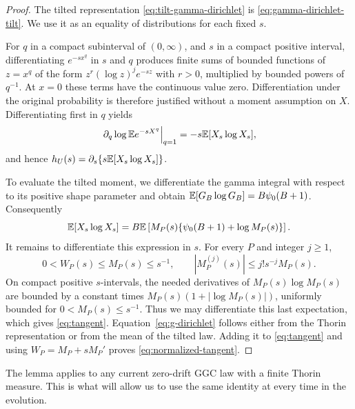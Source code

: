 \begin{proof}
The tilted representation \eqref{eq:tilt-gamma-dirichlet} is \eqref{eq:gamma-dirichlet-tilt}.
We use it as an equality of distributions for each fixed $s$.

For $q$ in a compact subinterval of $(0,\infty)$, and $s$ in a compact positive interval, differentiating $e^{-s x^q}$ in $s$ and $q$ produces finite sums of bounded functions of $z=x^q$ of the form $z^r(\log z)^j e^{-sz}$ with $r>0$, multiplied by bounded powers of $q^{-1}$.
At $x=0$ these terms have the continuous value zero.
Differentiation under the original probability is therefore justified without a moment assumption on $X$.
Differentiating first in $q$ yields
\[
 \left.\partial_q\log\mathbb E e^{-sX^q}\right|_{q=1}
 =-s\mathbb E[X_s\log X_s],
\]
and hence $h_U(s)=\partial_s\{s\mathbb E[X_s\log X_s]\}$.

To evaluate the tilted moment, we differentiate the gamma integral with respect to its positive shape parameter and obtain $\mathbb E[G_B\log G_B]=B\psi_0(B+1)$.
Consequently
\[
 \mathbb E[X_s\log X_s]
 =B\mathbb E\left[M_P(s)\{\psi_0(B+1)+\log M_P(s)\}\right].
\]
It remains to differentiate this expression in $s$.
For every $P$ and integer $j\ge1$,
\[
 0<W_P(s)\leq M_P(s)\leq s^{-1},\qquad
 |M_P^{(j)}(s)|\leq j!s^{-j}M_P(s).
\]
On compact positive $s$-intervals, the needed derivatives of $M_P(s)\log M_P(s)$ are bounded by a constant times $M_P(s)(1+|\log M_P(s)|)$, uniformly bounded for $0<M_P(s)\leq s^{-1}$.
Thus we may differentiate this last expectation, which gives \eqref{eq:tangent}.
Equation~\eqref{eq:g-dirichlet} follows either from the Thorin representation or from the mean of the tilted law.
Adding it to \eqref{eq:tangent} and using $W_P=M_P+sM_P'$ proves \eqref{eq:normalized-tangent}.
\end{proof}

The lemma applies to any current zero-drift GGC law with a finite Thorin measure.
This is what will allow us to use the same identity at every time in the evolution.
